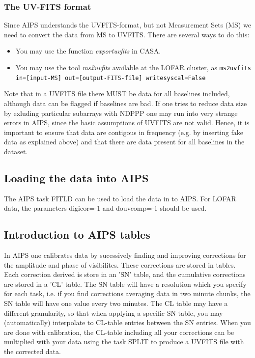 \subsubsection{The UV-FITS format}
Since AIPS understands the UVFITS-format, but not Measurement Sets (MS)
we need to convert the data from MS to UVFITS. There are several ways to do this:
\begin{itemize}
\item You may use the function \emph{exportuvfits} in CASA.
\item You may use the tool \emph{ms2uvfits} available at the LOFAR cluster, as {\tt ms2uvfits in=[input-MS] out=[output-FITS-file] writesyscal=False}
\end{itemize}
Note that in a UVFITS file there MUST be data for all baselines included, although
data can be flagged if baselines are bad. If one tries to reduce data size by exluding particular subarrays
with NDPPP one may run into very strange errors in AIPS, since the basic assumptions of UVFITS are not valid.
Hence, it is important to ensure that data are contigous in frequency (e.g. by inserting fake data as explained above)
and that there are data present for all baselines in the dataset. 

\subsection{Loading the data into AIPS}
The AIPS task FITLD can be used to load the data in to AIPS. For LOFAR data,
the parameters digicor=-1 and douvcomp=-1 should be used.

\subsection{Introduction to AIPS tables}
In AIPS one calibrates data by sucessively finding and improving corrections for the 
amplitude and phase of visibilites. These corrections are stored in tables.
Each correction derived is store in an 'SN' table, and the cumulative corrections
are stored in a 'CL' table. The SN table will have a resolution which you specify for each
task, i.e. if you find corrections averaging data in two minute chunks,
the SN table will have one value every two minutes. The CL table may have a different granularity,
so that when applying a specific SN table, you may (automatically) interpolate to 
CL-table entries between the SN entries. When you are done with calibration, the CL-table
including all your corrections can be multiplied with your data using the task SPLIT to produce
a UVFITS file with the corrected data.

